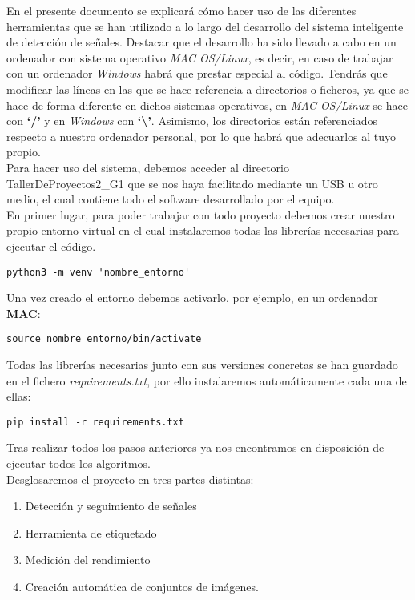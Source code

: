 En el presente documento se explicará cómo hacer uso de las diferentes herramientas que se han utilizado a lo largo del desarrollo del sistema inteligente de detección de señales. Destacar que el desarrollo ha sido llevado a cabo en un ordenador con sistema operativo \textit{MAC OS/Linux}, es decir, en caso de trabajar con un ordenador \textit{Windows} habrá que prestar especial al código. Tendrás que modificar las líneas en las que se hace referencia a directorios o ficheros, ya que se hace de forma diferente en dichos sistemas operativos, en \textit{MAC OS/Linux} se hace con \textbf{‘/’} y en \textit{Windows} con \textbf{‘\textbackslash ’}. Asimismo, los directorios están referenciados respecto a nuestro ordenador personal, por lo que habrá que adecuarlos al tuyo propio.\\

Para hacer uso del sistema, debemos acceder al directorio TallerDeProyectos2_G1 que se nos haya facilitado mediante un USB u otro medio, el cual contiene todo el software desarrollado por el equipo.\\

En primer lugar, para poder trabajar con todo proyecto debemos crear nuestro propio entorno virtual en el cual instalaremos todas las librerías necesarias para ejecutar el código. 

\begin{lstlisting}
python3 -m venv 'nombre_entorno'
\end{lstlisting}

Una vez creado el entorno debemos activarlo, por ejemplo, en un ordenador \textbf{MAC}:

\begin{lstlisting}
source nombre_entorno/bin/activate
\end{lstlisting}

Todas las librerías necesarias junto con sus versiones concretas se han guardado en el fichero \textit{requirements.txt}, por ello instalaremos automáticamente cada una de ellas:

\begin{lstlisting}
pip install -r requirements.txt
\end{lstlisting}

Tras realizar todos los pasos anteriores ya nos encontramos en disposición de ejecutar todos los algoritmos.\\
Desglosaremos el proyecto en tres partes distintas:
\begin{enumerate}
\item Detección y seguimiento de señales
\item Herramienta de etiquetado
\item Medición del rendimiento
\item Creación automática de conjuntos de imágenes.
\end{enumerate}

